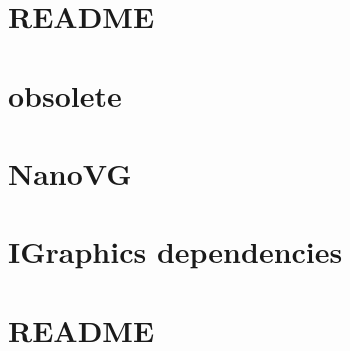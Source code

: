 \let\mypdfximage\pdfximage\def\pdfximage{\immediate\mypdfximage}\documentclass[twoside]{book}
\newcommand{\+}{\discretionary{\mbox{\scriptsize$\hookleftarrow$}}{}{}}
\begin{document}
\chapter{R\+E\+A\+D\+ME}
\label{md__c_1__users_fab_src__github_branches__neural_amp_modeler_plugin_i_plug2__dependencies__i_graphics__nano_s_v_g__r_e_a_d_m_e}

\chapter{obsolete}
\label{md__c_1__users_fab_src__github_branches__neural_amp_modeler_plugin_i_plug2__dependencies__i_grape3788f73d5b7a9720edded4162fb9ed5}

\chapter{Nano\+VG}
\label{md__c_1__users_fab_src__github_branches__neural_amp_modeler_plugin_i_plug2__dependencies__i_graphics__nano_v_g__r_e_a_d_m_e}

\chapter{I\+Graphics dependencies}
\label{md__c_1__users_fab_src__github_branches__neural_amp_modeler_plugin_i_plug2__dependencies__i_graphics__r_e_a_d_m_e}

\chapter{R\+E\+A\+D\+ME}
\label{md__c_1__users_fab_src__github_branches__neural_amp_modeler_plugin_i_plug2__dependencies__i_plug__a_a_x__s_d_k__r_e_a_d_m_e}

\end{document}

